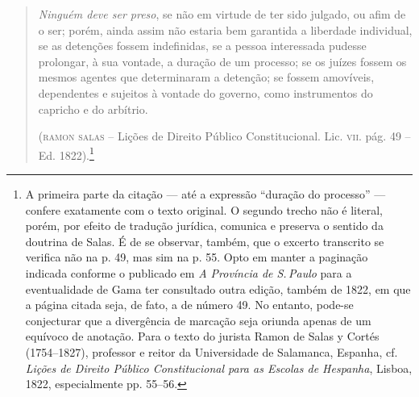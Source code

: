\begin{quote}
\emph{Ninguém deve ser preso}, se não em virtude de ter sido julgado,
ou afim de o ser; porém, ainda assim não estaria bem garantida a
liberdade individual, se as detenções fossem indefinidas, se a pessoa
interessada pudesse prolongar, à sua vontade, a duração de um processo;
se os juízes fossem os mesmos agentes que determinaram a detenção; se
fossem amovíveis, dependentes e sujeitos à vontade do governo, como
instrumentos do capricho e do arbítrio.

(\textsc{ramon salas} -- Lições de
Direito Público Constitucional. Lic. \textsc{vii}. pág. 49 -- Ed.
1822).\footnote{A primeira parte da citação --- até a expressão
  ``duração do processo'' --- confere exatamente com o texto original. O
  segundo trecho não é literal, porém, por efeito de tradução jurídica,
  comunica e preserva o sentido da doutrina de Salas. É de se observar,
  também, que o excerto transcrito se verifica não na p. 49, mas sim na
  p. 55. Opto em manter a paginação indicada conforme o publicado em
  \emph{A Província de S.\,Paulo} para a eventualidade de Gama ter
  consultado outra edição, também de 1822, em que a página citada seja,
  de fato, a de número 49. No entanto, pode-se conjecturar que a
  divergência de marcação seja oriunda apenas de um equívoco de
  anotação. Para o texto do jurista Ramon de Salas y Cortés (1754--1827),
  professor e reitor da Universidade de Salamanca, Espanha, cf.
  \emph{Lições de Direito Público Constitucional para as Escolas de
  Hespanha}, Lisboa, 1822, especialmente pp. 55--56.}
 \end{quote} 

